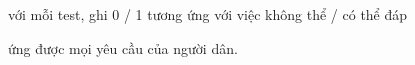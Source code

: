 với mỗi test, ghi 0 / 1 tương ứng với việc không thể / có thể đáp

ứng được mọi yêu cầu của người dân.

\